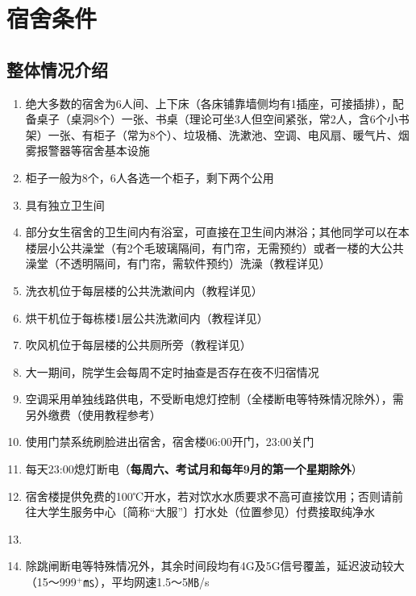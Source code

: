 \section[宿舍条件]{宿舍条件}

\subsection[整体情况介绍]{整体情况介绍}
\begin{enumerate}
    \item 绝大多数的宿舍为6人间、上下床\footnotemark（各床铺靠墙侧均有1插座，可接插排），配备桌子（桌洞8个）一张、书桌（理论可坐3人但空间紧张，常2人，含6个小书架）一张、有柜子（常为8个）、垃圾桶、洗漱池、空调、电风扇、暖气片、烟雾报警器等宿舍基本设施
    \item 柜子\footnotemark 一般为8个，6人各选一个柜子，剩下两个公用
    \item 具有独立卫生间
    \item 部分女生宿舍的卫生间内有浴室，可直接在卫生间内淋浴；其他同学可以在本楼层小公共澡堂（有2个毛玻璃隔间，有门帘，无需预约）或者一楼的大公共澡堂（不透明隔间，有门帘，需软件预约）洗澡（教程详见）
    \item 洗衣机位于每层楼的公共洗漱间内（教程详见）
    \item 烘干机位于每栋楼1层公共洗漱间内（教程详见）
    \item 吹风机位于每层楼的公共厕所旁（教程详见）
    \item 大一期间，院学生会每周不定时抽查是否存在夜不归宿情况
    \item 空调采用单独线路供电，不受断电熄灯控制（全楼断电等特殊情况除外），需另外缴费（使用教程参考）
    \item 使用门禁系统刷脸进出宿舍，宿舍楼06:00开门，23:00关门
    \item 每天23:00熄灯断电（\textbf{每周六、考试月和每年9月的第一个星期除外}）
    \item 宿舍楼提供免费的100℃开水\footnotemark，若对饮水水质要求不高可直接饮用；否则请前往大学生服务中心〔简称“大服”〕打水处（位置参见）付费接取纯净水
    \item \textbf{}
    \item 除跳闸断电等特殊情况外，其余时间段均有4G及5G信号覆盖，延迟波动较大（15～999$^+$㎳），平均网速1.5～5㎆/s
\end{enumerate}

